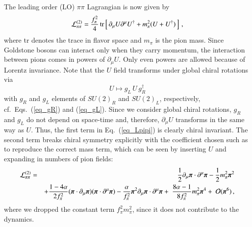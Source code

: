 \documentclass[sort&compress,preprint,3p]{elsarticle}
\begin{document}
The leading order (LO) 
$\pi\pi$ Lagrangian is now given by~\cite{GL84}
\begin{equation}
{\cal L}_{\pi\pi}^{(2)} =
\frac{f^2_\pi}{4} \, {\rm tr} \left[ \,
\partial_\mu U 
\partial^\mu U^\dagger 
+ m_\pi^2 ( U + U^\dagger)\, \right] \,,
\label{eq_Lpipi}
\end{equation}
where tr denotes the trace in flavor space and $m_\pi$ is the pion mass.
Since Goldstone bosons can interact only when they
carry momentum, the interaction between pions comes
in powers of $\partial_\mu U$.
Only even powers are allowed because of Lorentz invariance. 
Note that the $U$ field transforms under global chiral rotations via
\begin{equation}
U  \longmapsto  g_L \, U \, g_R^\dagger
\end{equation}
with $g_R$ and $g_L$  elements of 
$SU(2)_R$ and $SU(2)_L$, respectively,
cf.\ Eqs.~(\ref{eq_gR}) and (\ref{eq_gL}).
Since we consider global chiral rotations, 
$g_R$ and $g_L$ do not depend on space-time and, therefore,
$\partial_\mu U$ transforms in the same way as $U$.
Thus, the first term in Eq.~(\ref{eq_Lpipi}) is clearly chiral invariant.
The second term
breaks chiral symmetry explicitly with
the coefficient 
chosen such as to reproduce
the correct mass term, which can be seen by
inserting $U$ and expanding in numbers of
pion fields:
\begin{eqnarray}
	{\cal L}_{\pi\pi}^{(2)} 
     &=&
	\frac{1}{2} 
	\partial_\mu \mbox{\boldmath{$\pi$}} \cdot 
	\partial^\mu \mbox{\boldmath{$\pi$}}
     -  \frac{1}{2} m_\pi^2 \mbox{\boldmath{$\pi$}}^2
\label{eq_Lpipi2a}\\ &&
     +  \frac{1-4\alpha}{2f_\pi^2} 
        (\mbox{\boldmath{$\pi$}} \cdot \partial_\mu \mbox{\boldmath{$\pi$}})
        (\mbox{\boldmath{$\pi$}} \cdot \partial^\mu \mbox{\boldmath{$\pi$}})
     -  \frac{\alpha}{f_\pi^2} 
        \mbox{\boldmath{$\pi$}}^2
	\partial_\mu \mbox{\boldmath{$\pi$}} \cdot 
	\partial^\mu \mbox{\boldmath{$\pi$}}
     +\;  \frac{8\alpha-1}{8f_\pi^2} 
        m_\pi^2 \mbox{\boldmath{$\pi$}}^4
     + \; {\cal O} (\mbox{\boldmath $\pi$}^6)
\,,
\label{eq_Lpipi2}
\end{eqnarray}
where we dropped the constant term $f_\pi^2m_\pi^2$,
since it does not contribute to the dynamics.
\end{document}
